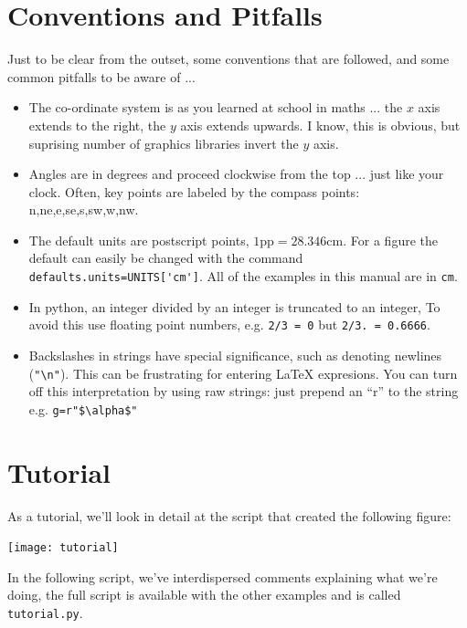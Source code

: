 \documentclass[a4paper]{book}
\begin{document}
\section{Conventions and Pitfalls}
\label{sec:conventions}

Just to be clear from the outset, some conventions that are followed, and 
some common pitfalls to be aware of ...

\begin{itemize}
\item The co-ordinate system is as you learned at school in maths ...
  the $x$ axis extends to the right, the $y$ axis extends upwards. I know, this is
  obvious, but suprising number of graphics libraries invert the $y$ axis.
\item Angles are in degrees and proceed clockwise from the top ...
  just like your clock. Often, key points are labeled by the compass
  points: n,ne,e,se,s,sw,w,nw.
\item The default units are postscript points,
  $1\mathrm{pp}=28.346\mathrm{cm}$. For a figure the default can
  easily be changed with the command
  \Verb|defaults.units=UNITS['cm']|. All of the examples in this manual are
  in \texttt{cm}.
\item In python, an integer divided by an integer is truncated to an
  integer, To avoid this use floating point numbers, e.g. \Verb|2/3 = 0|
  but \Verb|2/3. = 0.6666|.
\item Backslashes in strings have special significance, such as
  denoting newlines (\Verb|"\n"|). This can be frustrating for
  entering \LaTeX{} expresions. You can turn off this interpretation by
  using raw strings: just prepend an ``r'' to the string e.g.
  \Verb|g=r"$\alpha$"|
\end{itemize}


\section{Tutorial}
\label{sec:tutotial}

As a tutorial, we'll look in detail at the script that created the
following figure:
\begin{center}
  \texttt{[image: tutorial]}
\end{center}
In the following script, we've interdispersed 
comments explaining what we're doing, the full script is available
with the other examples and is called \texttt{tutorial.py}.
\end{document}
